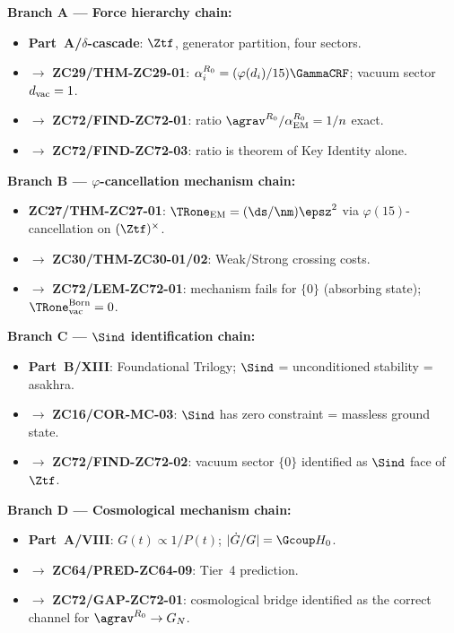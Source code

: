 \documentclass[12pt, a4paper]{article}
\renewcommand{\aEM}{\alpha_{\rm EM}}
\begin{document}
\begin{genealogybox}[title={How ZC72's Key Objects Trace Back}]

\textbf{Branch A --- Force hierarchy chain:}
\begin{itemize}[leftmargin=2em, noitemsep]
  \item \textbf{Part~A/$\delta$-cascade}:
    $\Ztf$, generator partition, four sectors.
  \item $\to$ \textbf{ZC29/THM-ZC29-01}:
    $\alpha_i^{R_0} = (\varphi(d_i)/15)\GammaCRF$; vacuum sector
    $d_{\rm vac} = 1$.
  \item $\to$ \textbf{ZC72/FIND-ZC72-01}:
    ratio $\agrav^{R_0}/\aEM^{R_0} = 1/n$ exact.
  \item $\to$ \textbf{ZC72/FIND-ZC72-03}:
    ratio is theorem of Key Identity alone.
\end{itemize}

\textbf{Branch B --- $\varphi$-cancellation mechanism chain:}
\begin{itemize}[leftmargin=2em, noitemsep]
  \item \textbf{ZC27/THM-ZC27-01}: $\TRone_{\rm EM} = (\ds/\nm)\epsz^2$
    via $\varphi(15)$-cancellation on $(\Ztf)^\times$.
  \item $\to$ \textbf{ZC30/THM-ZC30-01/02}: Weak/Strong crossing costs.
  \item $\to$ \textbf{ZC72/LEM-ZC72-01}: mechanism fails for $\{0\}$
    (absorbing state); $\TRone_{\rm vac}^{\rm Born} = 0$.
\end{itemize}

\textbf{Branch C --- $\Sind$ identification chain:}
\begin{itemize}[leftmargin=2em, noitemsep]
  \item \textbf{Part~B/XIII}: Foundational Trilogy;
    $\Sind$ = unconditioned stability = asakhra.
  \item $\to$ \textbf{ZC16/COR-MC-03}: $\Sind$ has zero constraint =
    massless ground state.
  \item $\to$ \textbf{ZC72/FIND-ZC72-02}: vacuum sector $\{0\}$
    identified as $\Sind$ face of $\Ztf$.
\end{itemize}

\textbf{Branch D --- Cosmological mechanism chain:}
\begin{itemize}[leftmargin=2em, noitemsep]
  \item \textbf{Part~A/VIII}: $G(t)\propto 1/P(t)$;
    $|\dot{G}/G| = \Gcoup H_0$.
  \item $\to$ \textbf{ZC64/PRED-ZC64-09}: Tier~4 prediction.
  \item $\to$ \textbf{ZC72/GAP-ZC72-01}: cosmological bridge
    identified as the correct channel for $\agrav^{R_0} \to G_N$.
\end{itemize}


\end{genealogybox}
\end{document}
